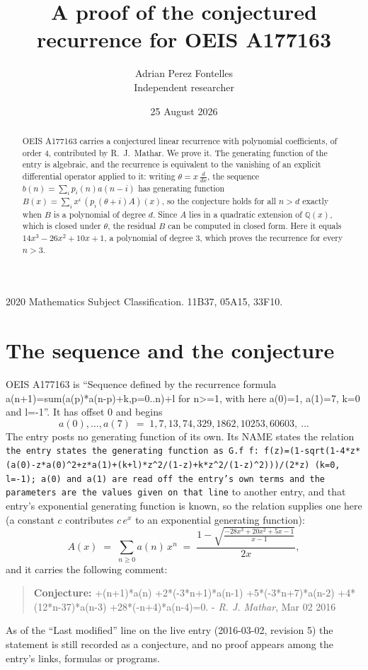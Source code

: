 \documentclass[11pt,a4paper]{article}
\title{A proof of the conjectured recurrence for OEIS A177163}
\author{Adrian Perez Fontelles\\ \small Independent researcher}
\date{25 August 2026}
\theoremstyle{plain}
\theoremstyle{definition}
\begin{document}
\maketitle

\begin{abstract}
OEIS A177163 carries a conjectured linear recurrence with polynomial coefficients, of
order 4, contributed by R.~J.~Mathar. We prove it. The generating function of the
entry is algebraic, and the recurrence is equivalent to the vanishing of an explicit
differential operator applied to it: writing $\theta=x\,\frac{d}{dx}$, the sequence
$b(n)=\sum_{i}p_{i}(n)a(n-i)$ has generating function
$B(x)=\sum_{i}x^{i}\,(p_{i}(\theta+i)A)(x)$, so the conjecture holds for all $n>d$ exactly
when $B$ is a polynomial of degree $d$. Since $A$ lies in a quadratic extension of
$\mathbb{Q}(x)$, which is closed under $\theta$, the residual $B$ can be computed in
closed form. Here it equals $14 x^{3} - 26 x^{2} + 10 x + 1$, a polynomial of degree $3$, which proves
the recurrence for every $n>3$.
\end{abstract}

\noindent\small 2020 Mathematics Subject Classification. 11B37, 05A15, 33F10.\normalsize

\section{The sequence and the conjecture}

OEIS A177163 is ``Sequence defined by the recurrence formula a(n+1)=sum(a(p)*a(n-p)+k,p=0..n)+l for n>=1, with here a(0)=1, a(1)=7, k=0 and l=-1''. It has offset $0$ and begins
\[
a(0),\dots,a(7)\;=\;1, 7, 13, 74, 329, 1862, 10253, 60603,\ \dots
\]
The entry posts no generating function of its own. Its NAME states the
relation \texttt{the entry states the generating function as G.f f: f(z)=(1-sqrt(1-4*z*(a(0)-z*a(0)\textasciicircum{}2+z*a(1)+(k+l)*z\textasciicircum{}2/(1-z)+k*z\textasciicircum{}2/(1-z)\textasciicircum{}2)))/(2*z) (k=0, l=-1); a(0) and a(1) are read off the entry's own terms and the parameters are the values given on that line} to another entry, and that entry's exponential generating
function is known, so the relation supplies one here (a constant $c$ contributes
$c\,e^{x}$ to an exponential generating function):
\begin{equation}\label{eq:gf}
A(x)\;=\;\sum_{n\ge 0} a(n)\,x^{n}\;=\;\frac{1 - \sqrt{\frac{- 28 x^{3} + 20 x^{2} + 5 x - 1}{x - 1}}}{2 x} ,
\end{equation}
and it carries the following comment:
\begin{quote}\small
\textbf{Conjecture:} +(n+1)*a(n) +2*(-3*n+1)*a(n-1) +5*(-3*n+7)*a(n-2) +4*(12*n-37)*a(n-3) +28*(-n+4)*a(n-4)=0. - \emph{R. J. Mathar}, Mar 02 2016
\end{quote}
As of the ``Last modified'' line on the live entry (2016-03-02, revision 5) the
statement is still recorded as a conjecture, and no proof appears among the entry's links,
formulas or programs.
\end{document}
